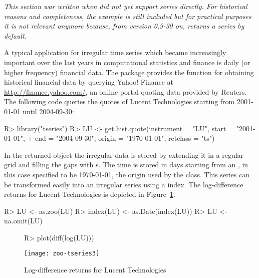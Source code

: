 \documentclass{Z}
\begin{document}
\emph{This section war written when  did not yet support 
series directly. For historical reasons and completeness, the example is still
included but for practical purposes it is not relevant anymore because,
from version 0.9-30 on,  returns a  series by default.}

A typical application for irregular time series which became increasingly
important over the last years in computational statistics and finance is
daily (or higher frequency) financial data. The package  provides
the function  for obtaining historical financial data
by querying Yahoo! Finance at \url{http://finance.yahoo.com/},
an online portal quoting data provided by Reuters. The following code
queries the quotes of Lucent Technologies starting from 2001-01-01
until 2004-09-30:

\begin{Schunk}
\begin{Sinput}
R> library("tseries")
R> LU <- get.hist.quote(instrument = "LU", start = "2001-01-01", 
+     end = "2004-09-30", origin = "1970-01-01", retclass = "ts")
\end{Sinput}
\end{Schunk}


In the returned  object the irregular data is stored by extending
it in a regular grid and filling the gaps with s. The time is stored
in days starting from an , in this case specified to be 1970-01-01, the
origin used by the  class.
This series can be transformed easily into an irregular  series 
using a  index. The log-difference returns for Lucent 
Technologies is depicted in Figure~\ref{fig:tseries}.

\begin{Schunk}
\begin{Sinput}
R> LU <- as.zoo(LU)
R> index(LU) <- as.Date(index(LU))
R> LU <- na.omit(LU)
\end{Sinput}
\end{Schunk}

\begin{figure}[h!]
\begin{center}
\begin{Schunk}
\begin{Sinput}
R> plot(diff(log(LU)))
\end{Sinput}
\end{Schunk}
\texttt{[image: zoo-tseries3]}
\caption{\label{fig:tseries} Log-difference returns for Lucent Technologies}
\end{center}
\end{figure}
\end{document}
